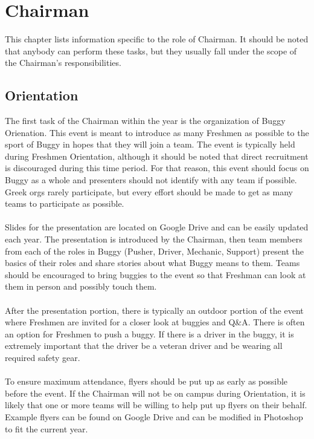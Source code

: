 \chapter{Chairman}
\label{ch:Chairman}

This chapter lists information specific to the role of Chairman. It should be
noted that anybody can perform these tasks, but they usually fall under the
scope of the Chairman's responsibilities.

\section{Orientation}
\label{sec:Orientation}
The first task of the Chairman within the year is the organization of Buggy
Orienation. This event is meant to introduce as many Freshmen as possible
to the sport of Buggy in hopes that they will join a team. The event is
typically held during Freshmen Orientation, although it should be noted
that direct recruitment is discouraged during this time period. For that
reason, this event should focus on Buggy as a whole and presenters should
not identify with any team if possible. Greek orgs rarely participate, but
every effort should be made to get as many teams to participate as possible.
\\\\
Slides for the presentation are located on Google Drive and can be easily
updated each year. The presentation is introduced by the Chairman, then
team members from each of the roles in Buggy (Pusher, Driver, Mechanic,
Support) present the basics of their roles and share stories about what
Buggy means to them. Teams should be encouraged to bring buggies to the event
so that Freshman can look at them in person and possibly touch them.
\\\\
After the presentation portion, there is typically an outdoor portion of the
event where Freshmen are invited for a closer look at buggies and Q\&A. There
is often an option for Freshmen to push a buggy. If there is a driver in the
buggy, it is extremely important that the driver be a veteran driver and be
wearing all required safety gear.
\\\\
To ensure maximum attendance, flyers should be put up as early as possible
before the event. If the Chairman will not be on campus during Orientation,
it is likely that one or more teams will be willing to help put up flyers on
their behalf. Example flyers can be found on Google Drive and can be modified
in Photoshop to fit the current year.

